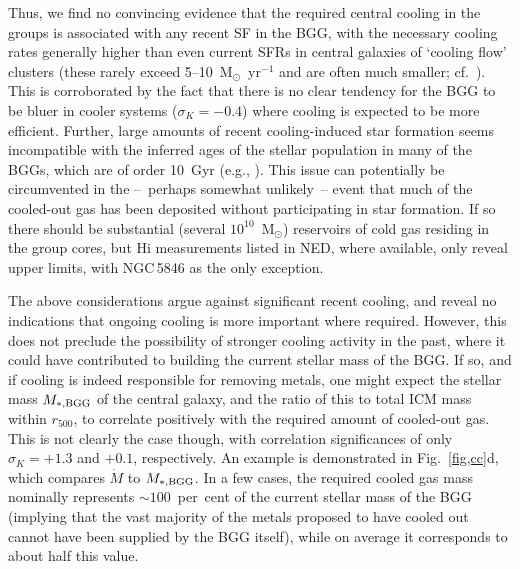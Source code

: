\documentclass[useAMS,usenatbib]{mn2e}
\begin{document}
Thus, we find no convincing evidence that the required central cooling
in the groups is associated with any recent SF in the BGG, with the
necessary cooling rates generally higher than even current SFRs in
central galaxies of `cooling flow' clusters (these rarely exceed
5--10~M$_\odot$~yr$^{-1}$ and are often much smaller; cf.\
\citealt{raff06}). This is corroborated by the fact that there is no
clear tendency for the BGG to be bluer in cooler systems ($\sigma_K =
-0.4$) where cooling is expected to be more efficient.  Further, large
amounts of recent cooling-induced star formation seems incompatible
with the inferred ages of the stellar population in many of the BGGs,
which are of order 10~Gyr (e.g., \citealt{hump06}).  This issue can
potentially be circumvented in the --~perhaps somewhat unlikely~--
event that much of the cooled-out gas has been deposited without
participating in star formation. If so there should be substantial
(several $10^{10}$~M$_\odot$) reservoirs of cold gas residing in the
group cores, but H{\sc i} measurements listed in NED, where available,
only reveal upper limits, with NGC\,5846 as the only exception.

The above considerations argue against significant recent cooling, and
reveal no indications that ongoing cooling is more important where
required. However, this does not preclude the possibility of stronger
cooling activity in the past, where it could have contributed to
building the current stellar mass of the BGG. If so, and if cooling is
indeed responsible for removing metals, one might expect the stellar
mass $M_{\rm \ast, BGG}$ of the central galaxy, and the ratio of this
to total ICM mass within $r_{500}$, to correlate positively with the
required amount of cooled-out gas. This is not clearly the case
though, with correlation significances of only $\sigma_K = +1.3$ and
$+0.1$, respectively.  An example is demonstrated in
Fig.~\ref{fig,cc}d, which compares $\dot M$ to $M_{\rm \ast, BGG}$.
In a few cases, the required cooled gas mass nominally represents
$\sim 100$~per~cent of the current stellar mass of the BGG (implying
that the vast majority of the metals proposed to have cooled out
cannot have been supplied by the BGG itself), while on average it
corresponds to about half this value.
\end{document}
